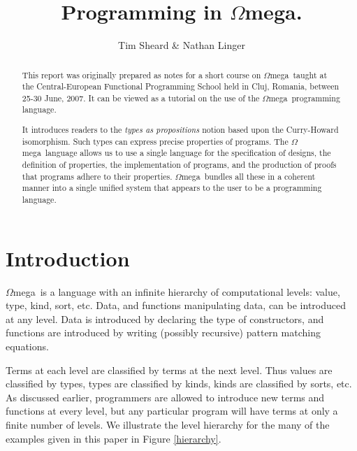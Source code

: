 \documentclass[11pt,twoside,A4]{llncs}
\newcommand{\om}{\emph{$\Omega$}mega}
\begin{document}
\title{Programming in \om.}
\author{Tim Sheard \& Nathan Linger}



\maketitle


\begin{abstract}
This report was originally prepared as notes for
a short course on \om\ taught at the 
Central-European Functional Programming School held in
Cluj, Romania, between 25-30 June, 2007. It can be viewed
as a tutorial on the use of the \om\ programming language.


\vspace*{0.1in}
It introduces readers to the {\em types as propositions}
notion based upon the Curry-Howard isomorphism.
Such types can express precise
properties of programs. The \om\ language allows us to use a single
language for the specification of designs, the definition of properties,
the implementation of programs, and the production of proofs that
programs adhere to their properties. \om\ bundles all these in a coherent
manner into a single unified system that appears to the user to be a
programming language.

\end{abstract}

\section{Introduction}\label{intro}

\om\ is a language with an infinite hierarchy of computational levels: value,
type, kind, sort, etc. Data, and functions manipulating data, can be introduced
at any level. Data is introduced by declaring the type of constructors, and
functions are introduced by writing (possibly recursive) pattern matching
equations.

Terms at each level are classified by terms at the next level. Thus values are
classified by types, types are classified by kinds, kinds are classified by
sorts, etc. As discussed earlier, programmers are allowed to introduce new terms
and functions at every level, but any particular program will have terms at only
a finite number of levels. We illustrate the level hierarchy for the many of the
examples given in this paper in Figure \ref{hierarchy}.
\end{document}

